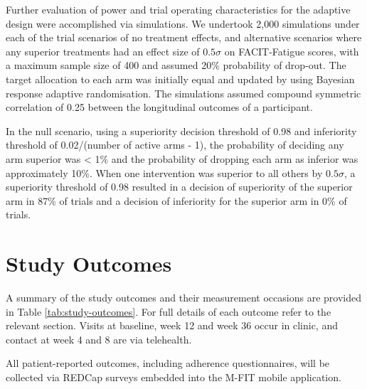 \documentclass[
]{article}
\begin{document}
Further evaluation of power and trial operating characteristics for the adaptive design were accomplished via simulations.
We undertook 2,000 simulations under each of the trial scenarios of no treatment effects, and alternative scenarios where any superior treatments had an effect size of $0.5\sigma$ on FACIT-Fatigue scores, with a maximum sample size of 400 and assumed 20\% probability of drop-out.
The target allocation to each arm was initially equal and updated by using Bayesian response adaptive randomisation.
The simulations assumed compound symmetric correlation of 0.25 between the longitudinal outcomes of a participant.

In the null scenario, using a superiority decision threshold of 0.98 and inferiority threshold of 0.02/(number of active arms - 1), the probability of deciding any arm superior was < 1\% and the probability of dropping each arm as inferior was approximately 10\%.
When one intervention was superior to all others by $0.5\sigma$, a superiority threshold of 0.98 resulted in a decision of superiority of the superior arm in 87\% of trials and a decision of inferiority for the superior arm in 0\% of trials.

\clearpage

\hypertarget{outcomes}{
  \section{Study Outcomes}\label{outcomes}}

A summary of the study outcomes and their measurement occasions are provided in Table \ref{tab:study-outcomes}.
For full details of each outcome refer to the relevant section.
Visits at baseline, week 12 and week 36 occur in clinic, and contact at week 4 and 8 are via telehealth.

All patient-reported outcomes, including adherence questionnaires, will be collected via REDCap surveys embedded into the M-FIT mobile application.
\end{document}
